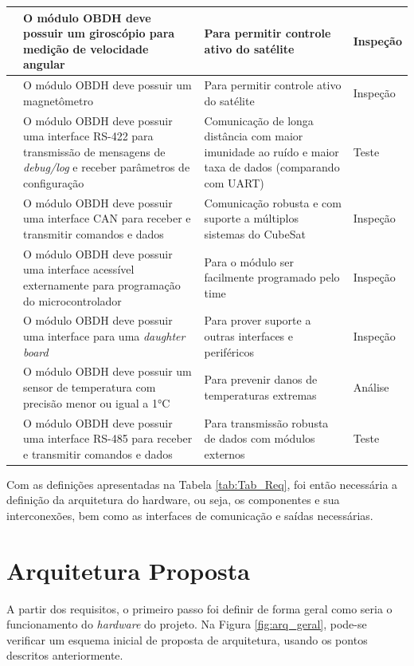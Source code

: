 \begin{longtable}{@{}>{\centering}p{1.5cm}p{4cm}p{4cm}p{4.7cm}@{}}
        \hline
        10 & O módulo OBDH deve possuir um giroscópio para medição de velocidade angular & Para permitir controle ativo do satélite  & Inspeção \tabularnewline 

       \hline
       11 & O módulo OBDH deve possuir um magnetômetro & Para permitir controle ativo do satélite  & Inspeção \tabularnewline

        \hline
        12 & O módulo OBDH deve possuir uma interface RS-422 para transmissão de mensagens de \textit{debug/log} e receber parâmetros de configuração & Comunicação de longa distância com maior imunidade ao ruído e maior taxa de dados (comparando com UART)  & Teste \tabularnewline

       \hline
       13 & O módulo OBDH deve possuir uma interface CAN para receber e transmitir comandos e dados & Comunicação robusta e com suporte a múltiplos sistemas do CubeSat  & Inspeção \tabularnewline

        \hline
        14 & O módulo OBDH deve possuir uma interface acessível externamente para programação do microcontrolador & Para o módulo ser facilmente programado pelo time  & Inspeção \tabularnewline

        \hline
        15 & O módulo OBDH deve possuir uma interface para uma \textit{daughter board} & Para prover suporte a outras interfaces e periféricos  & Inspeção \tabularnewline

        \hline
       16 & O módulo OBDH deve possuir um sensor de temperatura com precisão menor ou igual a 1°C & Para prevenir danos de temperaturas extremas & Análise\tabularnewline

        \hline
       17 & O módulo OBDH deve possuir uma interface RS-485 para receber e transmitir comandos e dados  & Para transmissão robusta de dados com módulos externos & Teste \tabularnewline
       \hline
\end{longtable}
{}

Com as definições apresentadas na Tabela \ref{tab:Tab_Req}, foi então necessária a definição da arquitetura do hardware, ou seja, os componentes e sua interconexões, bem como as interfaces de comunicação e saídas necessárias.

\section{Arquitetura Proposta}

A partir dos requisitos, o primeiro passo foi definir de forma geral como seria o funcionamento do \textit{hardware} do projeto. Na Figura \ref{fig:arq_geral}, pode-se verificar um esquema inicial de proposta de arquitetura, usando os pontos descritos anteriormente.

